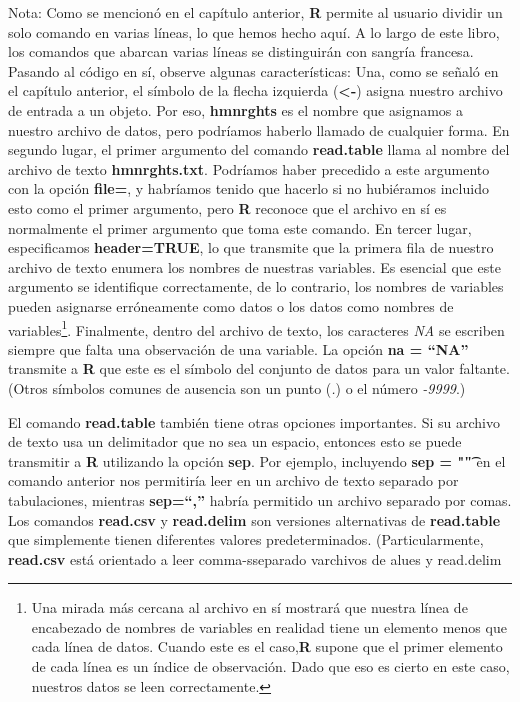 \documentclass[
]{book}
\begin{document}
Nota: Como se mencionó en el capítulo anterior, \textbf{R} permite al usuario dividir un solo comando en varias líneas, lo que hemos hecho aquí. A lo largo de este libro, los comandos que abarcan varias líneas se distinguirán con sangría francesa. Pasando al código en sí, observe algunas características: Una, como se señaló en el capítulo anterior, el símbolo de la flecha izquierda (\textbf{\textless-}) asigna nuestro archivo de entrada a un objeto. Por eso, \textbf{hmnrghts} es el nombre que asignamos a nuestro archivo de datos, pero podríamos haberlo llamado de cualquier forma. En segundo lugar, el primer argumento del comando \textbf{read.table} llama al nombre del archivo de texto \textbf{hmnrghts.txt}. Podríamos haber precedido a este argumento con la opción \textbf{file=}, y habríamos tenido que hacerlo si no hubiéramos incluido esto como el primer argumento, pero \textbf{R} reconoce que el archivo en sí es normalmente el primer argumento que toma este comando. En tercer lugar, especificamos \textbf{header=TRUE}, lo que transmite que la primera fila de nuestro archivo de texto enumera los nombres de nuestras variables. Es esencial que este argumento se identifique correctamente, de lo contrario, los nombres de variables pueden asignarse erróneamente como datos o los datos como nombres de variables\footnote{Una mirada más cercana al archivo en sí mostrará que nuestra línea de encabezado de nombres de variables en realidad tiene un elemento menos que cada línea de datos. Cuando este es el caso,\textbf{R} supone que el primer elemento de cada línea es un índice de observación. Dado que eso es cierto en este caso, nuestros datos se leen correctamente.}. Finalmente, dentro del archivo de texto, los caracteres \emph{NA} se escriben siempre que falta una observación de una variable. La opción \textbf{na = ``NA''} transmite a \textbf{R} que este es el símbolo del conjunto de datos para un valor faltante. (Otros símbolos comunes de ausencia son un punto (\emph{.}) o el número \emph{-9999}.)

El comando \textbf{read.table} también tiene otras opciones importantes. Si su archivo de texto usa un delimitador que no sea un espacio, entonces esto se puede transmitir a \textbf{R} utilizando la opción \textbf{sep}. Por ejemplo, incluyendo \textbf{sep = "\t"} en el comando anterior nos permitiría leer en un archivo de texto separado por tabulaciones, mientras \textbf{sep=``,''} habría permitido un archivo separado por comas. Los comandos \textbf{read.csv} y \textbf{read.delim} son versiones alternativas de \textbf{read.table} que simplemente tienen diferentes valores predeterminados. (Particularmente, \textbf{read.csv} está orientado a leer comma-sseparado varchivos de alues y read.delim
\end{document}
